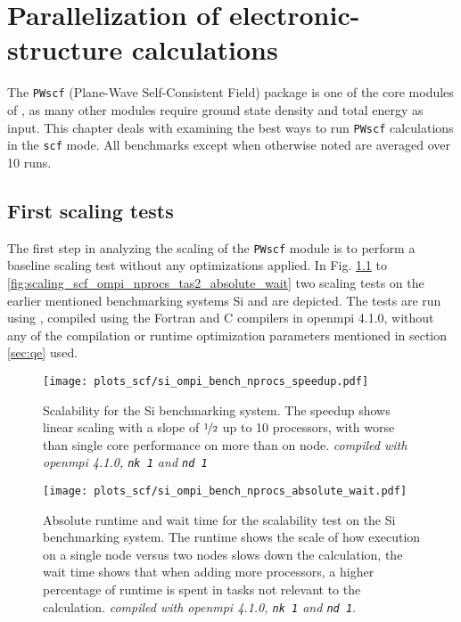 \documentclass[main.tex]{subfiles}
\begin{document}
\chapter{Parallelization of electronic-structure calculations\label{ch:optimisation_scf}}

The \texttt{PWscf} (Plane-Wave Self-Consistent Field) package is one of the core modules of \QE, as many other modules require ground state density and total energy as input.
This chapter deals with examining the best ways to run \texttt{PWscf} calculations in the \texttt{scf} mode.
All benchmarks except when otherwise noted are averaged over 10 runs.

\section{First scaling tests}\label{sec:scf_first_scaling}

The first step in analyzing the scaling of the \texttt{PWscf} module is to perform a baseline scaling test without any optimizations applied. 
In Fig. \ref{fig:scaling_scf_ompi_nprocs_si_speedup} to \ref{fig:scaling_scf_ompi_nprocs_tas2_absolute_wait} two scaling tests on the earlier mentioned benchmarking systems Si and \TaS are depicted. 
The tests are run using , compiled using the Fortran and C compilers in \gls{openmpi} 4.1.0, without any of the compilation or runtime optimization parameters mentioned in section \ref{sec:qe} used.

\begin{figure}[h!]
\centering
\texttt{[image: plots\_scf/si\_ompi\_bench\_nprocs\_speedup.pdf]}
\caption{Scalability for the Si benchmarking system. The speedup shows linear scaling with a slope of \(\nicefrac{1}{2}\) up to 10 processors, with worse than single core performance on more than on node. \emph{ compiled with \gls{openmpi} 4.1.0, \texttt{nk 1} and \texttt{nd 1}}}
\label{fig:scaling_scf_ompi_nprocs_si_speedup}
\end{figure}

\begin{figure}[b!]
\centering
\texttt{[image: plots\_scf/si\_ompi\_bench\_nprocs\_absolute\_wait.pdf]}
\caption{Absolute runtime and wait time for the scalability test on the Si benchmarking system. The runtime shows the scale of how execution on a single node versus two nodes slows down the calculation, the wait time shows that when adding more processors, a higher percentage of runtime is spent in tasks not relevant to the calculation. \emph{\QE compiled with \gls{openmpi} 4.1.0, \texttt{nk 1} and \texttt{nd 1}}. }
\label{fig:scaling_scf_ompi_nprocs_si_absolute_wait}
\end{figure}
\end{document}
